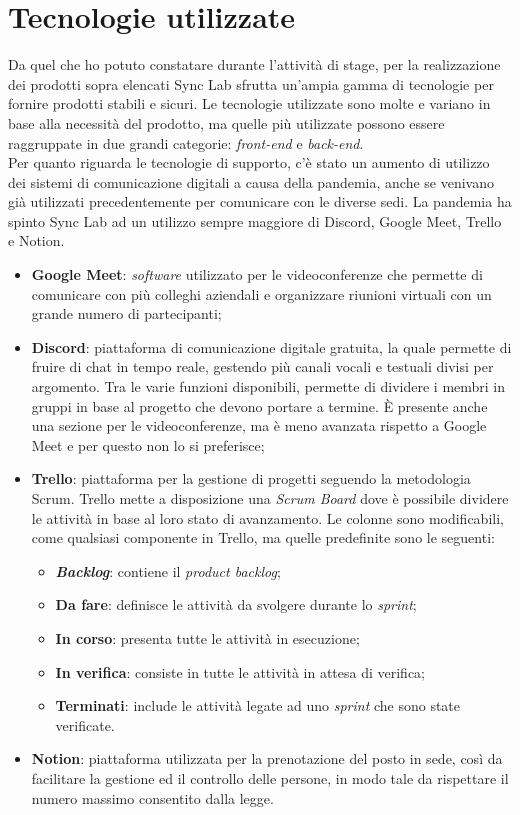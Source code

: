 \section{Tecnologie utilizzate}
Da quel che ho potuto constatare durante l'attività di stage, per la realizzazione dei prodotti sopra elencati Sync Lab sfrutta un'ampia gamma di tecnologie per fornire prodotti stabili e sicuri. Le tecnologie utilizzate sono molte e variano in base alla necessità del prodotto, ma quelle più utilizzate possono essere raggruppate in due grandi categorie: \textit{front-end} e \textit{back-end}. \\

Per quanto riguarda le tecnologie di supporto, c'è stato un aumento di utilizzo dei sistemi di comunicazione digitali a causa della pandemia, anche se venivano già utilizzati precedentemente per comunicare con le diverse sedi. La pandemia ha spinto Sync Lab ad un utilizzo sempre maggiore di Discord, Google Meet, Trello e Notion.

\begin{itemize}
  \item \textbf{Google Meet}: \textit{software} utilizzato per le videoconferenze che permette di comunicare con più colleghi aziendali e organizzare riunioni virtuali con un grande numero di partecipanti;
  \item \textbf{Discord}: piattaforma di comunicazione digitale gratuita, la quale permette di fruire di chat in tempo reale, gestendo più canali vocali e testuali divisi per argomento. Tra le varie funzioni disponibili, permette di dividere i membri in gruppi in base al progetto che devono portare a termine. È presente anche una sezione per le videoconferenze, ma è meno avanzata rispetto a Google Meet e per questo non lo si preferisce;
  \item \textbf{Trello}: piattaforma per la gestione di progetti seguendo la metodologia Scrum. Trello mette a disposizione una \textit{Scrum Board} dove è possibile dividere le attività in base al loro stato di avanzamento. Le colonne sono modificabili, come qualsiasi componente in Trello, ma quelle predefinite sono le seguenti:
  \begin{itemize}
    \item \textbf{\textit{Backlog}}: contiene il \textit{product backlog};
    \item \textbf{Da fare}: definisce le attività da svolgere durante lo \textit{sprint};
    \item \textbf{In corso}: presenta tutte le attività in esecuzione;
    \item \textbf{In verifica}: consiste in tutte le attività in attesa di verifica;
    \item \textbf{Terminati}: include le attività legate ad uno \textit{sprint} che sono state verificate. 
  \end{itemize}
  \item \textbf{Notion}: piattaforma utilizzata per la prenotazione del posto in sede, così da facilitare la gestione ed il controllo delle persone, in modo tale da rispettare il numero massimo consentito dalla legge.
\end{itemize}

